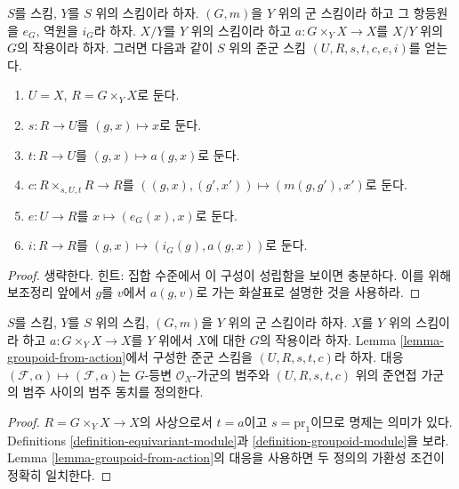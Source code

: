 \begin{lemma}
\label{lemma-groupoid-from-action}
$S$를 스킴, $Y$를 $S$ 위의 스킴이라 하자. $(G, m)$을 $Y$ 위의 군 스킴이라 하고 그 항등원을 $e_G$,
역원을 $i_G$라 하자. $X/Y$를 $Y$ 위의 스킴이라 하고 $a : G \times_Y X \to X$를 $X/Y$ 위의 $G$의 작용이라 하자.
그러면 다음과 같이 $S$ 위의 준군 스킴 $(U, R, s, t, c, e, i)$를 얻는다.
\begin{enumerate}
\item $U = X$, $R = G \times_Y X$로 둔다.
\item $s : R \to U$를 $(g, x) \mapsto x$로 둔다.
\item $t : R \to U$를 $(g, x) \mapsto a(g, x)$로 둔다.
\item $c : R \times_{s, U, t} R \to R$를 $((g, x), (g', x')) \mapsto (m(g, g'), x')$로 둔다.
\item $e : U \to R$를 $x \mapsto (e_G(x), x)$로 둔다.
\item $i : R \to R$를 $(g, x) \mapsto (i_G(g), a(g, x))$로 둔다.
\end{enumerate}
\end{lemma}

\begin{proof}
생략한다. 힌트: 집합 수준에서 이 구성이 성립함을 보이면 충분하다. 이를 위해 보조정리 앞에서 $g$를 $v$에서
$a(g, v)$로 가는 화살표로 설명한 것을 사용하라.
\end{proof}

\begin{lemma}
\label{lemma-action-groupoid-modules}
$S$를 스킴, $Y$를 $S$ 위의 스킴, $(G, m)$을 $Y$ 위의 군 스킴이라 하자. $X$를 $Y$ 위의 스킴이라 하고
$a : G \times_Y X \to X$를 $Y$ 위에서 $X$에 대한 $G$의 작용이라 하자. Lemma
\ref{lemma-groupoid-from-action}에서 구성한 준군 스킴을 $(U, R, s, t, c)$라 하자. 대응
$(\mathcal{F}, \alpha) \mapsto (\mathcal{F}, \alpha)$는 $G$-등변 $\mathcal{O}_X$-가군의 범주와
$(U, R, s, t, c)$ 위의 준연접 가군의 범주 사이의 범주 동치를 정의한다.
\end{lemma}

\begin{proof}
$R = G \times_Y X \to X$의 사상으로서 $t = a$이고 $s = \text{pr}_1$이므로 명제는 의미가 있다.
Definitions \ref{definition-equivariant-module}과 \ref{definition-groupoid-module}을 보라. Lemma
\ref{lemma-groupoid-from-action}의 대응을 사용하면 두 정의의 가환성 조건이 정확히 일치한다.
\end{proof}





